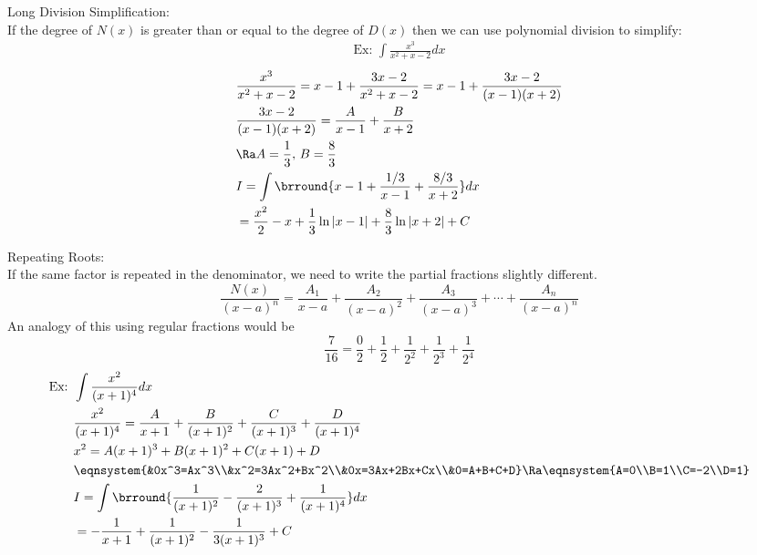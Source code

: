 Long Division Simplification:\\
If the degree of $N(x)$ is greater than or equal to the degree of $D(x)$ then we can use polynomial division to simplify:\\
\begin{align*}
    \text{Ex: }\int\frac{x^3}{x^2+x-2}dx
\end{align*}
\begin{align*}
    &\frac{x^3}{x^2+x-2}=x-1+\frac{3x-2}{x^2+x-2}=x-1+\frac{3x-2}{(x-1)(x+2)}\\
    &\frac{3x-2}{(x-1)(x+2)}=\frac{A}{x-1}+\frac{B}{x+2}\\
    &\Ra A=\frac{1}{3},\,B=\frac{8}{3}\\
    &I=\int\brround{x-1+\frac{1/3}{x-1}+\frac{8/3}{x+2}}dx\\
    &=\frac{x^2}{2}-x+\frac{1}{3}\ln|x-1|+\frac{8}{3}\ln|x+2|+C
\end{align*}

Repeating Roots:\\
If the same factor is repeated in the denominator, we need to write the partial fractions slightly different.
$$\frac{N(x)}{(x-a)^n}=\frac{A_1}{x-a}+\frac{A_2}{(x-a)^2}+\frac{A_3}{(x-a)^3}+\cdots+\frac{A_n}{(x-a)^n}$$
An analogy of this using regular fractions would be
$$\frac{7}{16}=\frac{0}{2}+\frac{1}{2}+\frac{1}{2^2}+\frac{1}{2^3}+\frac{1}{2^4}$$
\begin{align*}
    \text{Ex: }&\int\frac{x^2}{(x+1)^4}dx\\
    &\frac{x^2}{(x+1)^4}=\frac{A}{x+1}+\frac{B}{(x+1)^2}+\frac{C}{(x+1)^3}+\frac{D}{(x+1)^4}\\
    &x^2=A(x+1)^3+B(x+1)^2+C(x+1)+D\\
    &\eqnsystem{&0x^3=Ax^3\\&x^2=3Ax^2+Bx^2\\&0x=3Ax+2Bx+Cx\\&0=A+B+C+D}\Ra\eqnsystem{A=0\\B=1\\C=-2\\D=1}\\
    &I=\int\brround{\frac{1}{(x+1)^2}-\frac{2}{(x+1)^3}+\frac{1}{(x+1)^4}}dx\\
    &=-\frac{1}{x+1}+\frac{1}{(x+1)^2}-\frac{1}{3(x+1)^3}+C
\end{align*}

